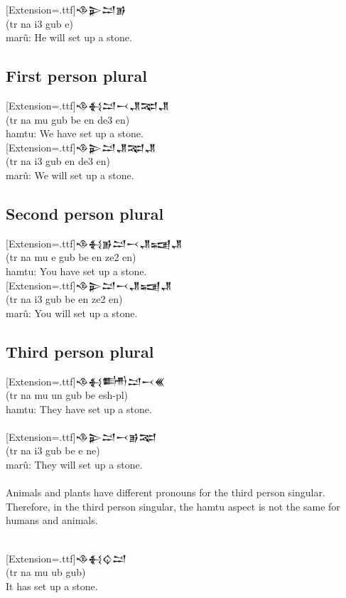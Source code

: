 \documentclass[a4paper,12pt]{book}
\newcommand{\fsm}{\Large\setmainfont{Akkadian}[Extension=.ttf]}
\begin{document}
\noindent
{\fsm 𒈾𒉌𒁺𒂊}\\
(tr na i3 gub e)\\
marû: He will set up a stone.

\subsection*{First person plural}
{\fsm 𒈾𒈬𒁺𒁁𒂗𒉈𒂗}\\
(tr na mu gub be en de3 en)\\
hamtu: We have set up a stone.\\

\noindent
{\fsm 𒈾𒉌𒁺𒂗𒉈𒂗}\\
(tr na i3 gub en de3 en)\\
marû: We will set up a stone.

\subsection*{Second person plural}
{\fsm 𒈾𒈬𒂊𒁺𒁁𒂗𒍢𒂗}\\
(tr na mu e gub be en ze2 en)\\
hamtu: You have set up a stone.\\

\noindent
{\fsm 𒈾𒉌𒁺𒁁𒂗𒍢𒂗}\\
(tr na i3 gub be en ze2 en)\\
marû: You will set up a stone.

\newpage
\subsection*{Third person plural}
{\fsm 𒈾𒈬𒌦𒁺𒁁𒌍}\\
(tr na mu un gub be esh-pl)\\
hamtu: They have set up a stone.\\

\verb||\\
{\fsm 𒈾𒉌𒁺𒁁𒂊𒉈}\\
(tr na i3 gub be e ne)\\
marû: They will set up a stone.\\

\verb||\\
Animals and plants have different pronouns
for the third person singular. Therefore,
in the third person singular, the hamtu aspect
is not the same for humans and animals.

\verb||\\
{\fsm 𒈾𒈬𒌒𒁺}\\
(tr na mu ub gub)\\
It has set up a stone.
\end{document}
